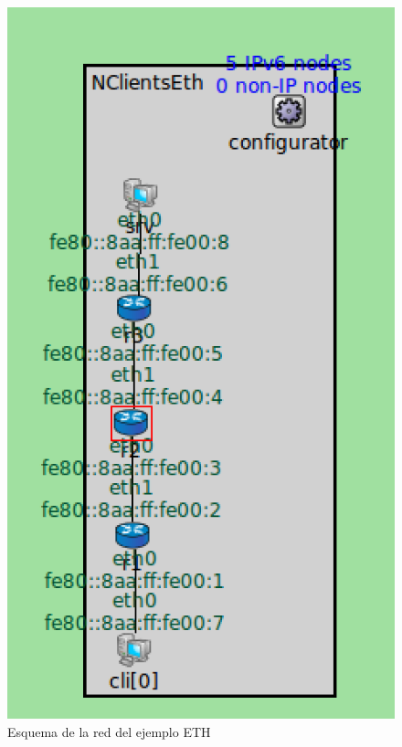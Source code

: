 \documentclass{article}
\begin{document}
			\begin{figure}[htb]
				\centering
				\includegraphics{P2/figura1.png}
				\caption{Esquema de la red del ejemplo ETH}
				\end {figure}		
				
				
				
		
	
\end{document}

